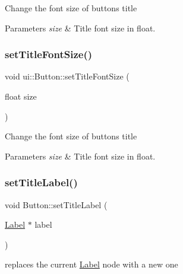 Change the font size of button\textquotesingle{}s title 
\begin{DoxyParams}{Parameters}
{\em size} & Title font size in float. \\
\hline
\end{DoxyParams}
\mbox{\label{classui_1_1Button_a121acb17ad948d29e69a82ebfde7b2a2}} 
\subsubsection{\texorpdfstring{set\+Title\+Font\+Size()}{setTitleFontSize()}\hspace{0.1cm}{\footnotesize\ttfamily [2/2]}}
{\footnotesize\ttfamily void ui\+::\+Button\+::set\+Title\+Font\+Size (\begin{DoxyParamCaption}\item[{float}]{size }\end{DoxyParamCaption})}

Change the font size of button\textquotesingle{}s title 
\begin{DoxyParams}{Parameters}
{\em size} & Title font size in float. \\
\hline
\end{DoxyParams}
\mbox{\label{classui_1_1Button_aaae3e845a20b8281d2d42eb277eda6e7}} 
\subsubsection{\texorpdfstring{set\+Title\+Label()}{setTitleLabel()}}
{\footnotesize\ttfamily void Button\+::set\+Title\+Label (\begin{DoxyParamCaption}\item[{\hyperlink{classLabel}{Label} $\ast$}]{label }\end{DoxyParamCaption})}

replaces the current \hyperlink{classLabel}{Label} node with a new one \mbox{\label{classui_1_1Button_a28183dc52fe6541ac1d85d7084cb5e78}} 
